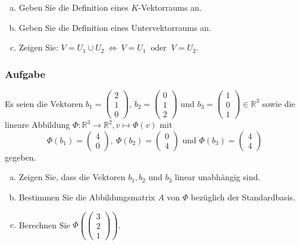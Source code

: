 \documentclass[a4paper,11pt]{scrartcl}
\newcounter{auf}
\newcommand{\Aufgabe}%
        {\addtocounter{auf}{1} \subsubsection*{\rmfamily  Aufgabe \theauf \hspace{1em}} }
\newcommand{\RR}{\mathbb{R}}
\begin{document}
\begin{enumerate}[a)]
\item Geben Sie die Definition eines $K$-Vektorraums an.
\item Geben Sie die Definition eines Untervektorraums an.
\item Zeigen Sie: $V=U_1\cup U_2  \ \Longleftrightarrow \ V=U_1\ \text{ oder }\ V=U_2.$
\end{enumerate}




\newpage
\Aufgabe

Es seien die Vektoren $b_1=\begin{pmatrix} 2\\1\\0\end{pmatrix}$, $b_2=\begin{pmatrix} 0\\1\\2\end{pmatrix}$ und $b_3=\begin{pmatrix} 1\\0\\1\end{pmatrix} \in \RR^3$ sowie die lineare Abbildung 
$
\Phi: \RR^3 \to \RR^2, v \mapsto \Phi(v)
$
mit 
$$
\Phi(b_1)=\begin{pmatrix} 4\\0\end{pmatrix}, \ \Phi(b_2)=\begin{pmatrix} 0\\4\end{pmatrix} \text{ und } \Phi(b_3)=\begin{pmatrix} 4\\4\end{pmatrix}
$$
gegeben.

\begin{enumerate}[a)]

\item Zeigen Sie, dass die Vektoren $b_1,b_2$ und $b_3$ linear unabhängig sind.
\item Bestimmen Sie die Abbildungsmatrix $A$ von $\Phi$ bezüglich der Standardbasis.
\item Berechnen Sie $\Phi(\begin{pmatrix} 3\\2\\1 \end{pmatrix})$.

\end{enumerate}
\end{document}

